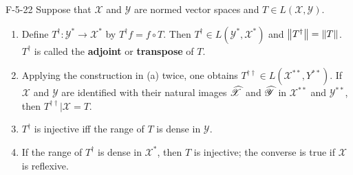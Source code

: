 \documentclass{article}
\begin{document}
	\begin{prb}{F-5-22}
		Suppose that $\mathscr{X}$ and $\mathscr{Y}$ are normed vector spaces and $T \in L(\mathscr{X}, \mathscr{Y})$. \vspace{-0.25cm}
		\begin{enumerate}[itemsep =-2pt,label = (\alph{*})]
			\item Define $T^{\dagger}: \mathscr{Y}^{\ast} \to \mathscr{X}^{\ast}$ by $T^{\dagger}f = f \circ T$. Then $T^{\dagger} \in L(\mathscr{Y}^{\ast}, \mathscr{X}^{\ast})$ and $\left\Vert T^{\dagger} \right\Vert  = \left\Vert T \right\Vert$. $T^{\dagger}$ is called the \textbf{adjoint} or \textbf{transpose} of $T$. 
			\item Applying the construction in (a) twice, one obtains $T^{\dagger\dagger} \in L(\mathscr{X}^{\ast\ast}, Y^{\ast\ast})$. If $\mathscr{X}$ and $\mathscr{Y}$ are identified with their natural images $\widehat{\mathscr{X}}$ and $\widehat{\mathscr{Y}}$ in $\mathscr{X}^{\ast\ast}$ and $\mathscr{Y}^{\ast\ast}$, then $T^{\dagger\dagger}|\mathscr{X} = T$. 
			\item $T^{\dagger}$ is injective iff the range of $T$ is dense in $\mathscr{Y}$. 
			\item If the range of $T^{\dagger}$ is dense in $\mathscr{X}^{\ast}$, then $T$ is injective; the converse is true if $\mathscr{X}$ is reflexive. 
		\end{enumerate}
	\end{prb}
\end{document}
